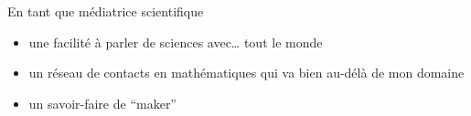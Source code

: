 \documentclass[ignorenonframetext,]{beamer}
\providecommand{\tightlist}{%
  \setlength{\itemsep}{0pt}\setlength{\parskip}{0pt}}
\begin{document}
\begin{frame}{En tant que médiatrice scientifique}
\protect\hypertarget{en-tant-que-muxe9diatrice-scientifique}{}

\begin{itemize}
\tightlist
\item
  une facilité à parler de sciences avec\ldots{} tout le monde
\item
  un réseau de contacts en mathématiques qui va bien au-délà de mon
  domaine
\item
  un savoir-faire de ``maker''
\end{itemize}

\end{frame}
\end{document}
